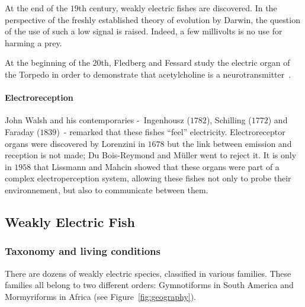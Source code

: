 At the end of the $19$th century, weakly electric fishes are discovered. In the
perspective of the freshly established theory of evolution by Darwin, the question
of the use of such a low signal is raised. Indeed, a few millivolts is no use
for harming a prey.

At the beginning of the $20$th, Fledberg and Fessard study the electric organ
of the Torpedo in order to demonstrate that acetylcholine is a
neurotransmitter~\cite{feldberg1942cholinergic}.

\paragraph{Electroreception}
John Walsh and his contemporaries -~Ingenhousz ($1782$), Schilling ($1772$) and
Faraday ($1839$)~- remarked that these fishes ``feel'' electricity. Electroreceptor
organs were discovered by Lorenzini in $1678$ but the link between emission and
reception is not made; Du Bois-Reymond and Müller went to reject it. It is only
in $1958$ that Lissmann and Mahcin showed that these organs were part of a
complex electroperception system, allowing these fishes not only to probe their
environnement, but also to communicate between them. 


\subsection{Weakly Electric Fish}


\subsubsection{Taxonomy and living conditions}

There are dozens of weakly electric species, classified in various
families. These families all belong to two different orders: Gymnotiforms
in South America and Mormyriforms in Africa (see Figure~\ref{fig:geography}).

